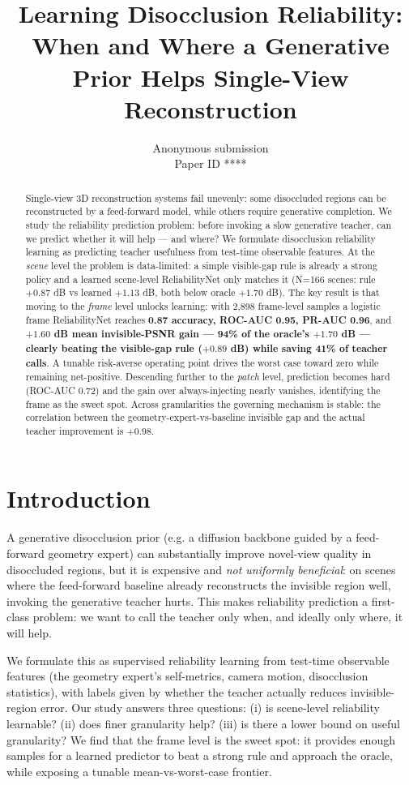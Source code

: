 \documentclass[10pt,twocolumn,letterpaper]{article}
\title{Learning Disocclusion Reliability:\\ When and Where a Generative Prior Helps Single-View Reconstruction}
\author{Anonymous submission\\\small Paper ID ****}
\date{}
\begin{document}
\maketitle

\begin{abstract}
Single-view 3D reconstruction systems fail unevenly: some disoccluded regions
can be reconstructed by a feed-forward model, while others require generative
completion. We study the reliability prediction problem: before invoking a slow
generative teacher, can we predict whether it will help --- and where? We
formulate disocclusion reliability learning as predicting teacher usefulness
from test-time observable features. At the \emph{scene} level the problem is
data-limited: a simple visible-gap rule is already a strong policy and a learned
scene-level ReliabilityNet only matches it (N=166 scenes: rule $+0.87$ dB vs
learned $+1.13$ dB, both below oracle $+1.70$ dB). The key result is that moving
to the \emph{frame} level unlocks learning: with 2{,}898 frame-level samples a
logistic frame ReliabilityNet reaches \textbf{0.87 accuracy, ROC-AUC 0.95,
PR-AUC 0.96}, and \textbf{$+1.60$ dB mean invisible-PSNR gain --- 94\% of the
oracle's $+1.70$ dB --- clearly beating the visible-gap rule ($+0.89$ dB) while
saving 41\% of teacher calls}. A tunable risk-averse operating point drives the
worst case toward zero while remaining net-positive. Descending further to the
\emph{patch} level, prediction becomes hard (ROC-AUC 0.72) and the gain over
always-injecting nearly vanishes, identifying the frame as the sweet spot.
Across granularities the governing mechanism is stable: the correlation between
the geometry-expert-vs-baseline invisible gap and the actual teacher improvement
is $+0.98$.
\end{abstract}

\section{Introduction}
\label{sec:intro}
A generative disocclusion prior (e.g. a diffusion backbone guided by a
feed-forward geometry expert) can substantially improve novel-view quality in
disoccluded regions, but it is expensive and \emph{not uniformly beneficial}: on
scenes where the feed-forward baseline already reconstructs the invisible region
well, invoking the generative teacher hurts. This makes reliability prediction a
first-class problem: we want to call the teacher only when, and ideally only
where, it will help.

We formulate this as supervised reliability learning from test-time observable
features (the geometry expert's self-metrics, camera motion, disocclusion
statistics), with labels given by whether the teacher actually reduces
invisible-region error. Our study answers three questions: (i) is scene-level
reliability learnable? (ii) does finer granularity help? (iii) is there a lower
bound on useful granularity? We find that the frame level is the sweet spot: it
provides enough samples for a learned predictor to beat a strong rule and
approach the oracle, while exposing a tunable mean-vs-worst-case frontier.
\end{document}
